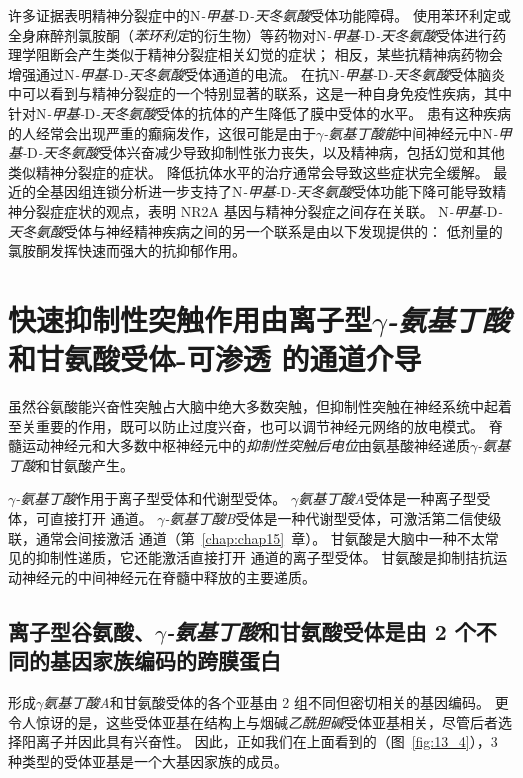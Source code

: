 许多证据表明精神分裂症中的N\textit{-甲基-}D\textit{-天冬氨酸}受体功能障碍。
使用苯环利定或全身麻醉剂氯胺酮（\textit{苯环利定}的衍生物）等药物对N\textit{-甲基-}D\textit{-天冬氨酸}受体进行药理学阻断会产生类似于精神分裂症相关幻觉的症状；
相反，某些抗精神病药物会增强通过N\textit{-甲基-}D\textit{-天冬氨酸}受体通道的电流。
在抗N\textit{-甲基-}D\textit{-天冬氨酸}受体脑炎中可以看到与精神分裂症的一个特别显著的联系，这是一种自身免疫性疾病，其中针对N\textit{-甲基-}D\textit{-天冬氨酸}受体的抗体的产生降低了膜中受体的水平。
患有这种疾病的人经常会出现严重的癫痫发作，这很可能是由于\textit{$\gamma$-氨基丁酸能}中间神经元中N\textit{-甲基-}D\textit{-天冬氨酸}受体兴奋减少导致抑制性张力丧失，以及精神病，包括幻觉和其他类似精神分裂症的症状。
降低抗体水平的治疗通常会导致这些症状完全缓解。
最近的全基因组连锁分析进一步支持了N\textit{-甲基-}D\textit{-天冬氨酸}受体功能下降可能导致精神分裂症症状的观点，表明 NR2A 基因与精神分裂症之间存在关联。
N\textit{-甲基-}D\textit{-天冬氨酸}受体与神经精神疾病之间的另一个联系是由以下发现提供的：
低剂量的氯胺酮发挥快速而强大的抗抑郁作用。



\section{快速抑制性突触作用由离子型\textit{$\gamma$-氨基丁酸}和甘氨酸受体-可渗透  的通道介导}

虽然谷氨酸能兴奋性突触占大脑中绝大多数突触，但抑制性突触在神经系统中起着至关重要的作用，既可以防止过度兴奋，也可以调节神经元网络的放电模式。
脊髓运动神经元和大多数中枢神经元中的\textit{抑制性突触后电位}由氨基酸神经递质\textit{$\gamma$-氨基丁酸}和甘氨酸产生。


\textit{$\gamma$-氨基丁酸}作用于离子型受体和代谢型受体。
\textit{$\gamma$氨基丁酸A}受体是一种离子型受体，可直接打开  通道。
\textit{$\gamma$-氨基丁酸B}受体是一种代谢型受体，可激活第二信使级联，通常会间接激活  通道（第~\ref{chap:chap15}~章）。 
甘氨酸是大脑中一种不太常见的抑制性递质，它还能激活直接打开  通道的离子型受体。
甘氨酸是抑制拮抗运动神经元的中间神经元在脊髓中释放的主要递质。



\subsection{离子型谷氨酸、\textit{$\gamma$-氨基丁酸}和甘氨酸受体是由 2 个不同的基因家族编码的跨膜蛋白}

形成\textit{$\gamma$氨基丁酸A}和甘氨酸受体的各个亚基由 2 组不同但密切相关的基因编码。
更令人惊讶的是，这些受体亚基在结构上与烟碱\textit{乙酰胆碱}受体亚基相关，尽管后者选择阳离子并因此具有兴奋性。 
因此，正如我们在上面看到的（图~\ref{fig:13_4}），3 种类型的受体亚基是一个大基因家族的成员。


